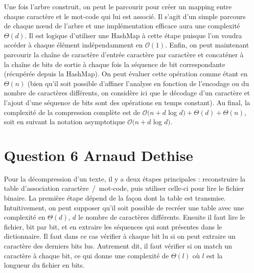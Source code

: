 \documentclass[10pt,a4paper]{article}
\begin{document}
Une fois l'arbre construit, on peut le parcourir pour créer un mapping entre chaque caractère et le mot-code qui lui est associé.
Il s'agit d'un simple parcours de chaque nœud de l'arbre et une implémentation efficace aura une complexité $\Theta(d)$.
Il est logique d'utiliser une HashMap à cette étape puisque l'on voudra accéder à chaque élément indépendamment en $\mathcal{O}(1)$.
Enfin, on peut maintenant parcourir la chaîne de caractère d'entrée caractère par caractère et concaténer à la chaîne de bits de sortie à chaque fois la séquence de bit correspondante (récupérée depuis la HashMap).
On peut évaluer cette opération comme étant en $\Theta(n)$ (bien qu'il soit possible d'affiner l'analyse en fonction de l'encodage ou du nombre de caractères différents, on considère ici que le décodage d'un caractère et l'ajout d'une séquence de bits sont des opérations en temps constant).
\vspace{0.3cm}
Au final, la complexité de la compression complète est de $\mathcal{O}(n + d $ log $ d) + \Theta(d) + \Theta(n)$, soit en suivant la notation asymptotique $\mathcal{O}(n + d $ log $ d)$.
\section*{Question 6 Arnaud Dethise}
Pour la décompression d'un texte, il y a deux étapes principales : reconstruire la table d'association caractère~/~mot-code, puis utiliser celle-ci pour lire le fichier binaire.
La première étape dépend de la façon dont la table est transmise. Intuitivement, on peut supposer qu'il soit possible de recréer une table avec une complexité en $\Theta(d)$, $d$ le nombre de caractères différents.
Ensuite il faut lire le fichier, bit par bit, et en extraire les séquences qui sont présentes dans le dictionnaire.
Il faut dans ce cas vérifier à chaque bit lu si on peut extraire un caractère des derniers bits lus. Autrement dit, il faut vérifier si on match un caractère à chaque bit, ce qui donne une complexité de $\Theta(l)$ où $l$ est la longueur du fichier en bits.
\end{document}
